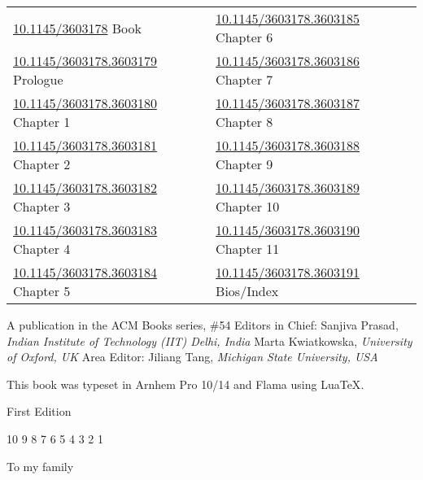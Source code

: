 \begin{copyrightenv}
{\begin{tabular}{@{}ll}
\href{http://dx.doi.org/10.1145/3603178}{10.1145/3603178}\,\,Book                            &    \href{http://dx.doi.org/10.1145/3603178.3603185}{10.1145/3603178.3603185}\,\,Chapter 6\\
\href{http://dx.doi.org/10.1145/3603178.3603179}{10.1145/3603178.3603179}\,\,Prologue        &    \href{http://dx.doi.org/10.1145/3603178.3603186}{10.1145/3603178.3603186}\,\,Chapter 7\\
\href{http://dx.doi.org/10.1145/3603178.3603180}{10.1145/3603178.3603180}\,\,Chapter 1       &    \href{http://dx.doi.org/10.1145/3603178.3603187}{10.1145/3603178.3603187}\,\,Chapter 8\\
\href{http://dx.doi.org/10.1145/3603178.3603181}{10.1145/3603178.3603181}\,\,Chapter 2       &    \href{http://dx.doi.org/10.1145/3603178.3603188}{10.1145/3603178.3603188}\,\,Chapter 9\\
\href{http://dx.doi.org/10.1145/3603178.3603182}{10.1145/3603178.3603182}\,\,Chapter 3       &    \href{http://dx.doi.org/10.1145/3603178.3603189}{10.1145/3603178.3603189}\,\,Chapter 10\\
\href{http://dx.doi.org/10.1145/3603178.3603183}{10.1145/3603178.3603183}\,\,Chapter 4       &    \href{http://dx.doi.org/10.1145/3603178.3603190}{10.1145/3603178.3603190}\,\,Chapter 11\\
\href{http://dx.doi.org/10.1145/3603178.3603184}{10.1145/3603178.3603184}\,\,Chapter 5       &    \href{http://dx.doi.org/10.1145/3603178.3603191}{10.1145/3603178.3603191}\,\,Bios/Index
\end{tabular}}%


A publication in the ACM Books series, \#54\hfill\break
Editors in Chief: Sanjiva Prasad, \textit{Indian Institute of Technology (IIT) Delhi, India}\hfill\break
\phantom{Editors in Chief: }Marta Kwiatkowska, \textit{University of Oxford, UK}\hfill\break
Area Editor: Jiliang Tang, \textit{Michigan State University, USA}

This book was typeset in Arnhem Pro 10/14 and Flama using {Lua\TeX}.\hfill\break


First Edition

10 9 8 7 6 5 4 3 2 1

\clearpage

\begin{dedication}
To my family
\end{dedication}


\end{copyrightenv} 